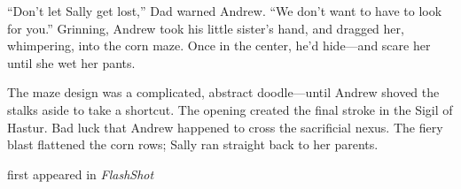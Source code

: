 ``Don't let Sally get lost,'' Dad warned Andrew. ``We don't want to have
to look for you.'' Grinning, Andrew took his little sister's hand, and
dragged her, whimpering, into the corn maze. Once in the center, he'd
hide---and scare her until she wet her pants.

The maze design was a complicated, abstract doodle---until Andrew shoved
the stalks aside to take a shortcut. The opening created the final
stroke in the Sigil of Hastur. Bad luck that Andrew happened to cross
the sacrificial nexus. The fiery blast flattened the corn rows; Sally
ran straight back to her parents.

first appeared in \emph{FlashShot}
